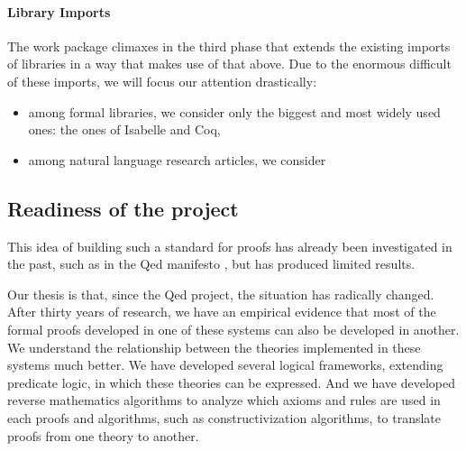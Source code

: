 \paragraph{Library Imports}
The work package climaxes in the third phase that extends the existing imports of libraries in a way that makes use of that above.
Due to the enormous difficult of these imports, we will focus our attention drastically:
\begin{itemize}
  \item among formal libraries, we consider only the biggest and most widely used ones: the ones of Isabelle and Coq,
  \item among natural language research articles, we consider    
\end{itemize}



\subsection{Readiness of the project}

This idea of building such a standard for proofs has already been
investigated in the past, such as in the Qed manifesto \cite{Qed94}, but
has produced limited results.

Our thesis is that, since the
Qed project, the situation has radically changed. After
thirty years of research, we have an empirical evidence that most of
the formal proofs developed in one of these systems can also be
developed in another. We understand the relationship between the
theories implemented in these systems much better. We have developed
several logical frameworks, extending predicate logic, in which these
theories can be expressed. And we have developed reverse mathematics
algorithms to analyze which axioms and rules are used in each proofs
and algorithms, such as constructivization algorithms, to translate
proofs from one theory to another.


